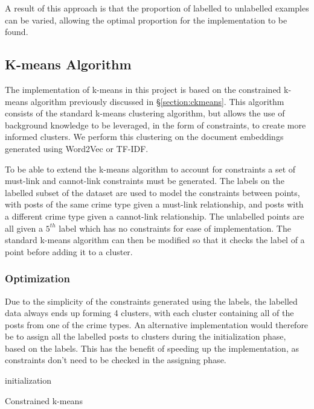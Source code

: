 \documentclass[12pt,a4paper,twoside,openright]{report}
\begin{document}
A result of this approach is that the proportion of labelled to unlabelled examples can be varied, allowing the optimal proportion for the implementation to be found.

\subsection{K-means Algorithm}
The implementation of k-means in this project is based on the constrained k-means algorithm previously discussed in \S\ref{section:ckmeans}. This algorithm consists of the standard k-means clustering algorithm, but allows the use of background knowledge to be leveraged, in the form of constraints, to create more informed clusters. We perform this clustering on the document embeddings generated using Word2Vec or TF-IDF.
\newline

To be able to extend the k-means algorithm to account for constraints a set of must-link and cannot-link constraints must be generated. The labels on the labelled subset of the dataset are used to model the constraints between points, with posts of the same crime type given a must-link relationship, and posts with a different crime type given a cannot-link relationship. The unlabelled points are all given a $5^{th}$ label which has no constraints for ease of implementation. The standard k-means algorithm can then be modified so that it checks the label of a point before adding it to a cluster.
\newline

\subsubsection{Optimization}
Due to the simplicity of the constraints generated using the labels, the labelled data always ends up forming 4 clusters, with each cluster containing all of the posts from one of the crime types. An alternative implementation would therefore be to assign all the labelled posts to clusters during the initialization phase, based on the labels. This has the benefit of speeding up the implementation, as constraints don't need to be checked in the assigning phase. 
\begin{algorithm}[hbt!]
    \SetAlgoLined
     initialization\;
     \caption{Constrained k-means}
\end{algorithm}
\end{document}
